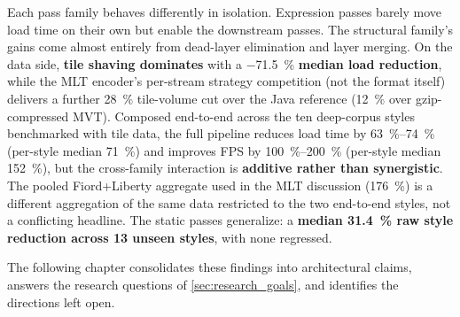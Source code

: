 \begin{chaptersummary}
Each pass family behaves differently in isolation.
Expression passes barely move load time on their own but enable the downstream passes.
The structural family's gains come almost entirely from dead-layer elimination and layer merging.
On the data side, \textbf{tile shaving dominates} with a \qty{-71.5}{\percent} \textbf{median load reduction}, while the \ac{MLT} encoder's per-stream strategy competition (not the format itself) delivers a further \qty{28}{\percent} tile-volume cut over the Java reference (\qty{12}{\percent} over gzip-compressed \ac{MVT}).
Composed end-to-end across the ten deep-corpus styles benchmarked with tile data, the full pipeline reduces load time by \qtyrange{63}{74}{\percent} (per-style median \qty{71}{\percent}) and improves \ac{FPS} by \qtyrange{100}{200}{\percent} (per-style median \qty{152}{\percent}), but the cross-family interaction is \textbf{additive rather than synergistic}.
The pooled Fiord+Liberty aggregate used in the \ac{MLT} discussion (\qty{+176}{\percent}) is a different aggregation of the same data restricted to the two end-to-end styles, not a conflicting headline.
The static passes generalize: a \textbf{median \qty{31.4}{\percent} raw style reduction across 13 unseen styles}, with none regressed.

The following chapter consolidates these findings into architectural claims, answers the research questions of \cref{sec:research_goals}, and identifies the directions left open.
\end{chaptersummary}
